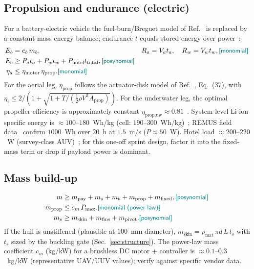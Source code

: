 \documentclass[conf]{new-aiaa}
\newcommand{\gpc}[1]{\textcolor{teal}{\small\textsf{[#1]}}} %
\begin{document}
\subsection{Propulsion and endurance (electric)}
For a battery-electric vehicle the fuel-burn/Breguet model of Ref.~\cite{hoburg2014geometric} is
replaced by a constant-mass energy balance; endurance $t$ equals stored energy over
power~\cite{allen2000propulsion,rutherford2008southampton,lin2026energies}:
\begin{align}
E_b   &= e_b\, m_b,                  & R_a   &= V_a t_a,\quad R_w = V_w t_w, \gpc{monomial}\\
E_b   &\ge P_a t_a + P_w t_w + P_{\text{hotel}}t_{\text{total}}, \gpc{posynomial}\\
\eta_a&\le \eta_{\text{motor}}\,\eta_{\text{prop}}. \gpc{monomial}
\end{align}
For the aerial leg, $\eta_{\text{prop}}$ follows the actuator-disk model of
Ref.~\cite{hoburg2014geometric}, Eq.~(37), with $\eta_i\le 2/(1+\sqrt{1+T/(\frac12\rho V^2
A_{\text{prop}})})$. For the underwater leg, the optimal propeller efficiency is approximately
constant $\eta_{\text{prop,uw}}\approx0.81$~\cite{allen2000propulsion}. System-level Li-ion
specific energy is $\approx100$--$180$~Wh/kg (cell: $190$--$300$~Wh/kg)~\cite{lin2026energies};
REMUS field data~\cite{allen2000propulsion} confirm $1000$~Wh over $20$~h at $1.5$~m/s ($P
\approx50$~W). Hotel load $\approx 200$--$220$~W (survey-class AUV)~\cite{lin2026energies}; for
this one-off sprint design, factor it into the fixed-mass term or drop if payload power is
dominant.

\subsection{Mass build-up}
\begin{align}
m &\ge m_{\text{pay}} + m_s + m_b + m_{\text{prop}} + m_{\text{fixed}}, \gpc{posynomial}\\
m_{\text{prop}} &\le c_m\,P_{\max}. \gpc{monomial (power-law)}\\
m_s &\ge m_{\text{skin}} + m_{\text{fins}} + m_{\text{pivot}}. \gpc{posynomial}
\end{align}
If the hull is unstiffened (plausible at $100$~mm diameter), $m_{\text{skin}} = \rho_{\text{mat}}\,\pi
d\,L\,t_s$ with $t_s$ sized by the buckling gate (Sec.~\ref{sec:structure}). The power-law mass
coefficient $c_m$ (kg/kW) for a brushless DC motor + controller is $\approx 0.1$--$0.3$~kg/kW
(representative UAV/UUV values); verify against specific vendor data.
\end{document}
